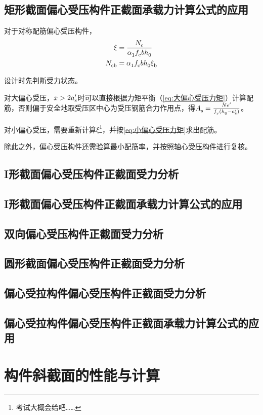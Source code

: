 \documentclass{article}
\begin{document}
\subsection{矩形截面偏心受压构件正截面承载力计算公式的应用}
\par 对于对称配筋偏心受压构件，
\begin{align}
      \xi            & = \frac{\script{N}{c}}{\script{\alpha}{1}\script{f}{c}b\script{h}{0}} \\
      \script{N}{cb} & = \script{\alpha}{1}\script{f}{c}b\script{h}{0}\script{\xi}{b}
\end{align}
\par 设计时先判断受力状态。
\par 对大偏心受压，$x>2\script{a}[\prime]{s}$时可以直接根据力矩平衡（\cref{eq:大偏心受压力矩}）计算配筋，否则偏于安全地取受压区中心为受压钢筋合力作用点，得$\script{A}{s}=\frac{N\script{e}[\prime]{}}{\script{f}{y}(\script{h}{0}-\script{a}[\prime]{s})}$。
\par 对小偏心受压，需要重新计算$\xi$\footnote{考试大概会给吧……}，并按\cref{eq:小偏心受压力矩}求出配筋。
\par 除此之外，偏心受压构件还需验算最小配筋率，并按照轴心受压构件进行复核。
\subsection{I形截面偏心受压构件正截面受力分析}
\subsection{I形截面偏心受压构件正截面承载力计算公式的应用}
\subsection{双向偏心受压构件正截面受力分析}
\subsection{圆形截面偏心受压构件正截面受力分析}
\subsection{偏心受拉构件偏心受压构件正截面受力分析}
\subsection{偏心受拉构件偏心受压构件正截面承载力计算公式的应用}
\section{构件斜截面的性能与计算}
\end{document}
